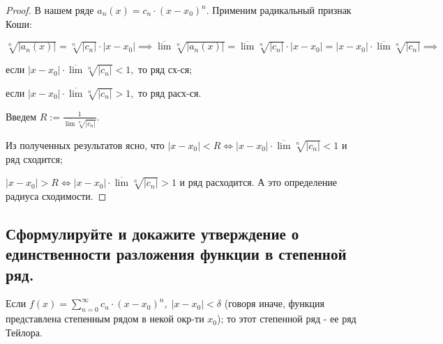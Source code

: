\documentclass[a4paper, fleqn]{article}
\begin{document}
        \begin{proof} 
        В нашем ряде $a_n(x) = c_n \cdot (x - x_0)^n.$ Применим радикальный признак Коши: 
        
        $\sqrt[n]{|a_n(x)|} = \sqrt[n]{|c_n|} \cdot |x - x_0| \implies
        \overline{\lim} \sqrt[n]{|a_n(x)|} = \overline{\lim} \sqrt[n]{|c_n|} \cdot |x - x_0| =
        |x - x_0| \cdot \overline{\lim} \sqrt[n]{|c_n|} \implies $ 
        
        если $|x - x_0| \cdot \overline{\lim} \sqrt[n]{|c_n|} < 1,$ то ряд сх-ся;
        
        если $|x - x_0| \cdot \overline{\lim} \sqrt[n]{|c_n|} > 1,$ то ряд расх-ся.
        
        Введем $R := \frac{1}{\overline{\lim} \sqrt[n]{|c_n|}}.$
        
        Из полученных результатов ясно, что $|x - x_0| < R \iff |x - x_0| \cdot \overline{\lim} \sqrt[n]{|c_n|} < 1$ и ряд сходится; 
        
        $|x - x_0| > R \iff |x - x_0| \cdot \overline{\lim} \sqrt[n]{|c_n|} > 1$ и ряд расходится. А это определение радиуса сходимости.
        
        \end{proof}
        
        
        
        
        
        
        
        
        
        
    
    \subsection{Сформулируйте и докажите утверждение о единственности разложения функции в степенной ряд.}
    
    
    Если $f(x) = \displaystyle \sum_{n = 0}^{\infty} c_n \cdot (x - x_0)^n, \; |x - x_0| < \delta$ (говоря иначе, функция представлена степенным рядом в некой окр-ти $x_0$); то этот степенной ряд - ее ряд Тейлора. 
    
\end{document}
